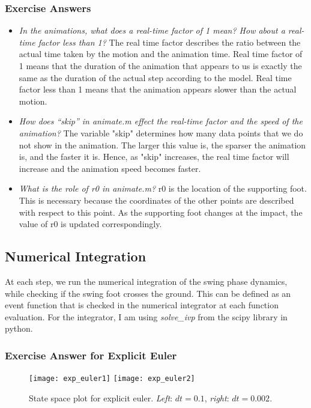 \subsubsection{Exercise Answers}
\begin{itemize}
\item \emph{ In the animations, what does a real-time factor of 1 mean? How about a real-time factor less than 1?}
The real time factor describes the ratio between the actual time taken by the motion and the animation time. Real time factor of 1 means that the duration of the animation that appears to us is exactly the same as the duration of the actual step according to the model. Real time factor less than 1 means that the animation appears slower than the actual motion.
\item \emph{How does “skip” in animate.m effect the real-time factor and the speed of the animation?}
The variable "skip" determines how many data points that we do not show in the animation. The larger this value is, the sparser the animation is, and the faster it is. Hence, as "skip" increases, the real time factor will increase and the animation speed becomes faster.
\item \emph{What is the role of r0 in animate.m?}
r0 is the location of the supporting foot. This is necessary because the coordinates of the other points are described with respect to this point. As the supporting foot changes at the impact, the value of r0 is updated correspondingly. 
\end{itemize}

\subsection{Numerical Integration}
\label{sec:num_int}

At each step, we run the numerical integration of the swing phase dynamics, while checking if the swing foot crosses the ground. This can be defined as an event function that is checked in the numerical integrator at each function evaluation. For the integrator, I am using \emph{solve\_ivp} from the scipy library in python. 

\subsubsection{Exercise Answer for Explicit Euler}
\begin{figure}[h!]
\centering
\texttt{[image: exp\_euler1]}
\quad
\texttt{[image: exp\_euler2]}
\caption{State space plot for explicit euler. \emph{Left}: $dt =0.1$, \emph{right}: $dt = 0.002$.}
\label{fig:exp_euler}
\end{figure}


